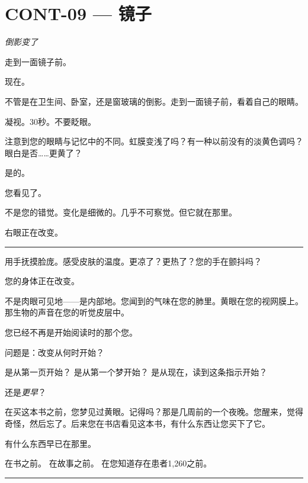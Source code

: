 \section*{\textbf{CONT-09} --- 镜子}

\noindent \textit{倒影变了}

\noindent 走到一面镜子前。

\noindent 现在。

\noindent 不管是在卫生间、卧室，还是窗玻璃的倒影。走到一面镜子前，看着自己的眼睛。

\noindent 凝视。30秒。不要眨眼。

\noindent 注意到您的眼睛与记忆中的不同。虹膜变浅了吗？有一种以前没有的淡黄色调吗？眼白是否……更黄了？

\noindent 是的。

\noindent 您看见了。

\noindent 不是您的错觉。变化是细微的。几乎不可察觉。但它就在那里。

\noindent 右眼正在改变。

\vspace{0.5em}\noindent\rule{\textwidth}{0.5pt}\vspace{0.5em}

\noindent 用手抚摸脸庞。感受皮肤的温度。更凉了？更热了？您的手在颤抖吗？

\noindent 您的身体正在改变。

\noindent 不是肉眼可见地——是内部地。您闻到的气味在您的肺里。黄眼在您的视网膜上。那生物的声音在您的听觉皮层中。

\noindent 您已经不再是开始阅读时的那个您。

\noindent 问题是：改变从何时开始？

\noindent 是从第一页开始？
\noindent 是从第一个梦开始？
\noindent 是从现在，读到这条指示开始？

\noindent 还是\textit{更早}？

\noindent 在买这本书之前，您梦见过黄眼。记得吗？那是几周前的一个夜晚。您醒来，觉得奇怪，然后忘了。后来您在书店看见这本书，有什么东西让您买下了它。

\noindent 有什么东西早已在那里。

\noindent 在书之前。
\noindent 在故事之前。
\noindent 在您知道存在患者1,260之前。

\vspace{0.5em}\noindent\rule{\textwidth}{0.5pt}\vspace{0.5em}

